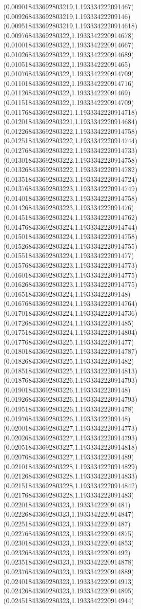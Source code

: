 {(0.009018433692803219,1.193334222091467)
(0.009268433692803219,1.19333422209146)
(0.009518433692803219,1.1933342220914618)
(0.00976843369280322,1.1933342220914678)
(0.01001843369280322,1.1933342220914667)
(0.01026843369280322,1.1933342220914689)
(0.01051843369280322,1.193334222091465)
(0.01076843369280322,1.1933342220914709)
(0.01101843369280322,1.1933342220914716)
(0.01126843369280322,1.193334222091469)
(0.01151843369280322,1.1933342220914709)
(0.011768433692803221,1.1933342220914718)
(0.012018433692803221,1.1933342220914684)
(0.012268433692803222,1.1933342220914758)
(0.012518433692803222,1.1933342220914744)
(0.012768433692803222,1.1933342220914733)
(0.013018433692803222,1.1933342220914758)
(0.013268433692803222,1.1933342220914782)
(0.013518433692803223,1.1933342220914724)
(0.013768433692803223,1.1933342220914749)
(0.014018433692803223,1.1933342220914758)
(0.014268433692803223,1.193334222091476)
(0.014518433692803224,1.1933342220914762)
(0.014768433692803224,1.1933342220914744)
(0.015018433692803224,1.1933342220914758)
(0.015268433692803224,1.1933342220914755)
(0.015518433692803224,1.193334222091477)
(0.015768433692803223,1.1933342220914773)
(0.016018433692803223,1.1933342220914775)
(0.016268433692803223,1.1933342220914775)
(0.016518433692803224,1.19333422209148)
(0.016768433692803224,1.1933342220914764)
(0.017018433692803224,1.1933342220914736)
(0.017268433692803224,1.193334222091485)
(0.017518433692803224,1.1933342220914804)
(0.017768433692803225,1.193334222091477)
(0.018018433692803225,1.1933342220914787)
(0.018268433692803225,1.193334222091482)
(0.018518433692803225,1.1933342220914813)
(0.018768433692803226,1.1933342220914793)
(0.019018433692803226,1.19333422209148)
(0.019268433692803226,1.1933342220914793)
(0.019518433692803226,1.193334222091478)
(0.019768433692803226,1.19333422209148)
(0.020018433692803227,1.1933342220914773)
(0.020268433692803227,1.1933342220914793)
(0.020518433692803227,1.1933342220914818)
(0.020768433692803227,1.193334222091489)
(0.021018433692803228,1.1933342220914829)
(0.021268433692803228,1.1933342220914833)
(0.021518433692803228,1.1933342220914842)
(0.021768433692803228,1.193334222091483)
(0.02201843369280323,1.193334222091481)
(0.02226843369280323,1.1933342220914847)
(0.02251843369280323,1.193334222091487)
(0.02276843369280323,1.1933342220914875)
(0.02301843369280323,1.1933342220914853)
(0.02326843369280323,1.193334222091492)
(0.02351843369280323,1.1933342220914878)
(0.02376843369280323,1.1933342220914889)
(0.02401843369280323,1.1933342220914913)
(0.02426843369280323,1.1933342220914895)
(0.02451843369280323,1.1933342220914944)
}

